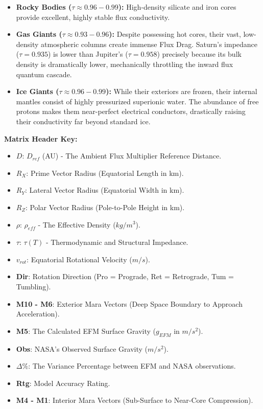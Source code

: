 \documentclass[11pt, a4paper]{article}
\begin{document}
  \begin{itemize}
    \item \textbf{Rocky Bodies ($\tau \approx 0.96 - 0.99$):} High-density silicate and iron cores provide excellent, highly stable flux conductivity.
    \item \textbf{Gas Giants ($\tau \approx 0.93 - 0.96$):} Despite possessing hot cores, their vast, low-density atmospheric columns create immense Flux Drag. Saturn's impedance ($\tau = 0.935$) is lower than Jupiter's ($\tau = 0.958$) precisely because its bulk density is dramatically lower, mechanically throttling the inward flux quantum cascade.
    \item \textbf{Ice Giants ($\tau \approx 0.96 - 0.99$):} While their exteriors are frozen, their internal mantles consist of highly pressurized superionic water. The abundance of free protons makes them near-perfect electrical conductors, drastically raising their conductivity far beyond standard ice.
  \end{itemize}

  \clearpage
  \vspace{1em}
  \noindent
  \textbf{Matrix Header Key:}
  \begin{itemize}
    \setlength{\itemsep}{0pt}
    \item \textbf{$D$}: $D_{ref}$ (AU) - The Ambient Flux Multiplier Reference Distance.
    \item \textbf{$R_X$}: Prime Vector Radius (Equatorial Length in km).
    \item \textbf{$R_Y$}: Lateral Vector Radius (Equatorial Width in km).
    \item \textbf{$R_Z$}: Polar Vector Radius (Pole-to-Pole Height in km).
    \item \textbf{$\rho$}: $\rho_{eff}$ - The Effective Density ($kg/m^3$).
    \item \textbf{$\tau$}: $\tau(T)$ - Thermodynamic and Structural Impedance.
    \item \textbf{$v_{rot}$}: Equatorial Rotational Velocity ($m/s$).
    \item \textbf{Dir}: Rotation Direction (Pro = Prograde, Ret = Retrograde, Tum = Tumbling).
    \item \textbf{M10 - M6}: Exterior Mara Vectors (Deep Space Boundary to Approach Acceleration).
    \item \textbf{M5}: The Calculated EFM Surface Gravity ($g_{EFM}$ in $m/s^2$).
    \item \textbf{Obs}: NASA's Observed Surface Gravity ($m/s^2$).
    \item \textbf{$\Delta\%$}: The Variance Percentage between EFM and NASA observations.
    \item \textbf{Rtg}: Model Accuracy Rating.
    \item \textbf{M4 - M1}: Interior Mara Vectors (Sub-Surface to Near-Core Compression).
  \end{itemize}
\end{document}
